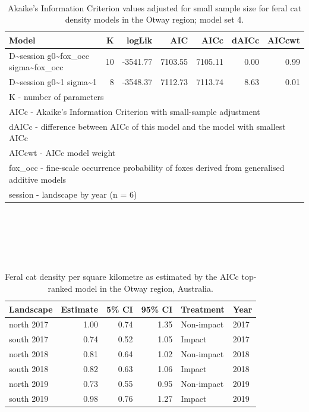 \documentclass[11pt,a4paper,titlepage,twoside,openright]{style/unimelbthesis}
\begin{document}
\begin{mainmatter}
\newpage

\(~\)

\(~\)

\(~\)

\begingroup\fontsize{10}{12}\selectfont
\begin{longtable}[t]{lrrrrrr}
\caption{\label{tab:density-aic-o-4}Akaike's Information Criterion values adjusted for small sample size for feral cat density models in the Otway region; model set 4.}\\
\toprule
Model & K & logLik & AIC & AICc & dAICc & AICcwt\\
\midrule
D\textasciitilde{}session g0\textasciitilde{}fox\_occ sigma\textasciitilde{}fox\_occ & 10 & -3541.77 & 7103.55 & 7105.11 & 0.00 & 0.99\\
D\textasciitilde{}session g0\textasciitilde{}1 sigma\textasciitilde{}1 & 8 & -3548.37 & 7112.73 & 7113.74 & 8.63 & 0.01\\
\bottomrule
\multicolumn{7}{l}{\rule{0pt}{1em}K - number of parameters}\\
\multicolumn{7}{l}{\rule{0pt}{1em}AICc - Akaike's Information Criterion with small-sample adjustment}\\
\multicolumn{7}{l}{\rule{0pt}{1em}dAICc - difference between AICc of this model and the model with smallest AICc}\\
\multicolumn{7}{l}{\rule{0pt}{1em}AICcwt - AICc model weight}\\
\multicolumn{7}{l}{\rule{0pt}{1em}fox\_occ - fine-scale occurrence probability of foxes derived from generalised additive models}\\
\multicolumn{7}{l}{\rule{0pt}{1em}session - landscape by year (n = 6)}\\
\end{longtable}
\endgroup{}

\newpage

\(~\)

\(~\)

\(~\)

\begingroup\fontsize{10}{12}\selectfont
\begin{longtable}[t]{lrrrll}
\caption{\label{tab:density-aic-o-5}Feral cat density per square kilometre as estimated by the AICc top-ranked model in the Otway region, Australia.}\\
\toprule
Landscape & Estimate & 5\% CI & 95\% CI & Treatment & Year\\
\midrule
north 2017 & 1.00 & 0.74 & 1.35 & Non-impact & 2017\\
south 2017 & 0.74 & 0.52 & 1.05 & Impact & 2017\\
north 2018 & 0.81 & 0.64 & 1.02 & Non-impact & 2018\\
south 2018 & 0.82 & 0.63 & 1.06 & Impact & 2018\\
north 2019 & 0.73 & 0.55 & 0.95 & Non-impact & 2019\\
\addlinespace
south 2019 & 0.98 & 0.76 & 1.27 & Impact & 2019\\
\bottomrule
\end{longtable}
\endgroup{}

\newpage

\end{mainmatter}
\end{document}
